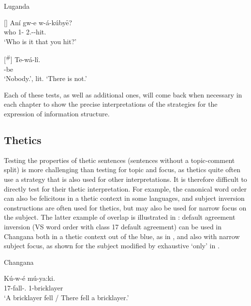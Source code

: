 \documentclass[output=paper]{langscibook}
\begin{document}
\ea
Luganda \citep[360]{vanderWalNamyalo2016}\\
\label{bkm:Ref134776908}
\begin{xlist}
[]{
\gll
Aní  gw-e  w-á-kúbyȇ?\\
who  1-\FOC{}  2\SG.\SM{}-\PST{}-hit.\PFV{}\\
\glt
‘Who is it that you hit?’\\
}

[\textsuperscript{\#}]{
\gll
Te-wá-lî.\\
\SM{}-be\\
\glt
‘Nobody.’, lit. ‘There is not.’
}

\end{xlist}
\z

Each of these tests, as well as additional ones, will come back when necessary in each chapter to show the precise interpretations of the strategies for the expression of information structure.

\subsection{Thetics}
\label{bkm:Ref134712116}
Testing the properties of thetic sentences (sentences without a topic-comment split) is more challenging than testing for topic and focus, as thetics quite often use a strategy that is also used for other interpretations. It is therefore difficult to directly test for their thetic interpretation. For example, the canonical word order can also be felicitous in a thetic context in some languages, and subject inversion constructions are often used for thetics, but may also be used for narrow focus on the subject. The latter example of overlap is illustrated in : default agreement inversion (VS word order with class 17 default agreement) can be used in Changana both in a thetic context out of the blue, as in , and also with narrow subject focus, as shown for the subject modified by exhaustive ‘only’ in . 

 \ea\label{bkm:Ref122698455}
Changana \citep[236, 238]{vanderWalSimango2022}

\ea
\label{bkm:Ref122698455:a}
\gll
Kú-w-é  mú-ya:ki.\\
17\SM{}-fall-\PFV{}.\CJ{}  1-bricklayer\\
\glt
‘A bricklayer fell / There fell a bricklayer.’\\
\end{document}
